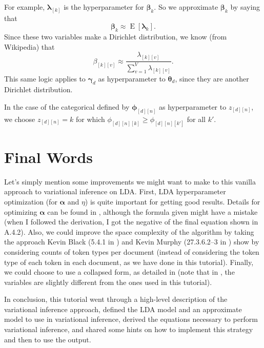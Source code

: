 \documentclass[12pt]{article}
\newcommand{\E}{\operatorname{E}}
\begin{document}
For example, $\bm{\lambda}_{[k]}$ is the hyperparameter for $\bm{\beta}_{k}$.
So we approximate $\bm{\beta}_{k}$ by saying that
\begin{equation}
    \bm{\beta}_{k} \approx \E[\bm{\lambda}_{k}].
\end{equation}
Since these two variables make a Dirichlet distribution, we know (from
Wikipedia) that
\begin{equation}
    \beta_{[k][v]} \approx \frac{\lambda_{[k][v]}}{\sum_{v=1}^{V}
    \lambda_{[k][v]}}.
\end{equation}
This same logic applies to $\bm{\gamma}_{d}$ as hyperparameter to
$\bm{\theta}_{d}$, since they are another Dirichlet distribution.

In the case of the categorical defined by $\bm{\phi}_{[d][n]}$ as hyperparameter
to $z_{[d][n]}$, we choose $z_{[d][n]} = k$ for which $\phi_{[d][n][k]} \geq
\phi_{[d][n][k']}$ for all $k'$.  \section{Final Words}

Let's simply mention some improvements we might want to make to this vanilla
approach to variational inference on LDA.  First, LDA hyperparameter
optimization (for $\bm{\alpha}$ and $\eta$) is quite important for getting good
results.  Details for optimizing $\bm{\alpha}$ can be found in
\autocite{Blei:2003:LDA}, although the formula given might have a mistake (when
I followed the derivation, I got the negative of the final equation shown in
A.4.2).  Also, we could improve the space complexity of the algorithm by taking
the approach Kevin Black (5.4.1 in \autocite{kb}) and Kevin Murphy (27.3.6.2--3
in \autocite{Murphy}) show by considering counts of token types per document
(instead of considering the token type of each token in each document, as we
have done in this tutorial).  Finally, we could choose to use a collapsed form,
as detailed in \autocite{collapsedvariational} (note that in
\autocite{collapsedvariational}, the variables are slightly different from the
ones used in this tutorial).

In conclusion, this tutorial went through a high-level description of the
variational inference approach, defined the LDA model and an approximate model
to use in variational inference, derived the equations necessary to perform
variational inference, and shared some hints on how to implement this strategy
and then to use the output.

\printbibliography
\end{document}
